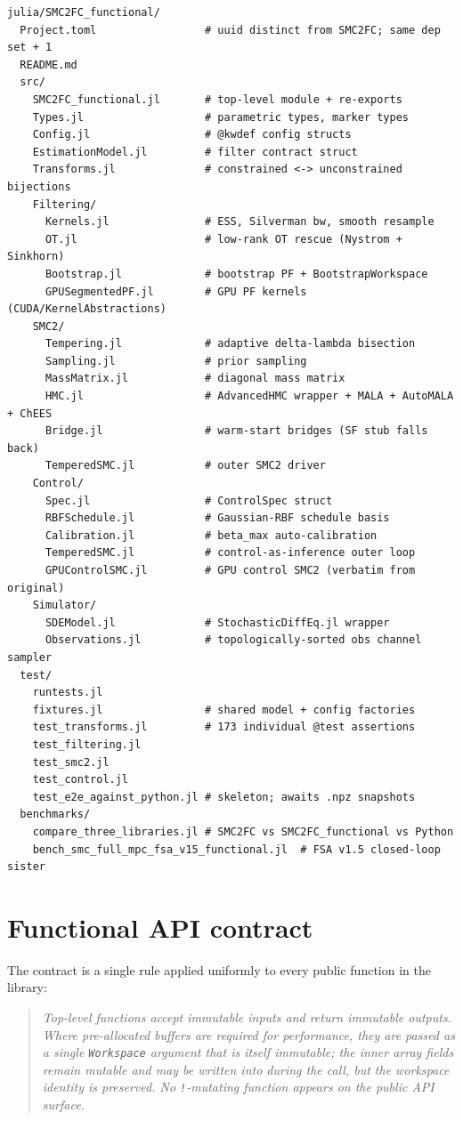 \documentclass[11pt,a4paper]{article}
\begin{document}
\begin{lstlisting}
julia/SMC2FC_functional/
  Project.toml                 # uuid distinct from SMC2FC; same dep set + 1
  README.md
  src/
    SMC2FC_functional.jl       # top-level module + re-exports
    Types.jl                   # parametric types, marker types
    Config.jl                  # @kwdef config structs
    EstimationModel.jl         # filter contract struct
    Transforms.jl              # constrained <-> unconstrained bijections
    Filtering/
      Kernels.jl               # ESS, Silverman bw, smooth resample
      OT.jl                    # low-rank OT rescue (Nystrom + Sinkhorn)
      Bootstrap.jl             # bootstrap PF + BootstrapWorkspace
      GPUSegmentedPF.jl        # GPU PF kernels (CUDA/KernelAbstractions)
    SMC2/
      Tempering.jl             # adaptive delta-lambda bisection
      Sampling.jl              # prior sampling
      MassMatrix.jl            # diagonal mass matrix
      HMC.jl                   # AdvancedHMC wrapper + MALA + AutoMALA + ChEES
      Bridge.jl                # warm-start bridges (SF stub falls back)
      TemperedSMC.jl           # outer SMC2 driver
    Control/
      Spec.jl                  # ControlSpec struct
      RBFSchedule.jl           # Gaussian-RBF schedule basis
      Calibration.jl           # beta_max auto-calibration
      TemperedSMC.jl           # control-as-inference outer loop
      GPUControlSMC.jl         # GPU control SMC2 (verbatim from original)
    Simulator/
      SDEModel.jl              # StochasticDiffEq.jl wrapper
      Observations.jl          # topologically-sorted obs channel sampler
  test/
    runtests.jl
    fixtures.jl                # shared model + config factories
    test_transforms.jl         # 173 individual @test assertions
    test_filtering.jl
    test_smc2.jl
    test_control.jl
    test_e2e_against_python.jl # skeleton; awaits .npz snapshots
  benchmarks/
    compare_three_libraries.jl # SMC2FC vs SMC2FC_functional vs Python
    bench_smc_full_mpc_fsa_v15_functional.jl  # FSA v1.5 closed-loop sister
\end{lstlisting}

\section{Functional API contract}
\label{sec:contract}

The contract is a single rule applied uniformly to every public function
in the library:

\begin{quote}
\itshape Top-level functions accept immutable inputs and return immutable
outputs. Where pre-allocated buffers are required for performance, they
are passed as a single \texttt{Workspace} argument that is itself
\emph{immutable}; the inner array fields remain mutable and may be written
into during the call, but the workspace identity is preserved. No
\texttt{!}-mutating function appears on the public API surface.
\end{quote}
\end{document}
